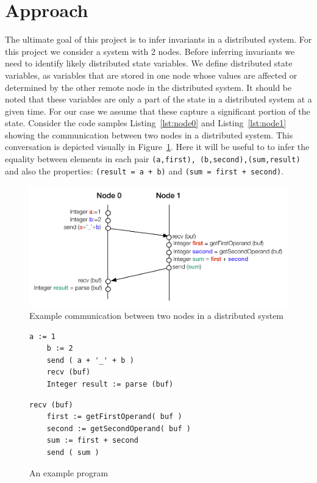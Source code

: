 \section{Approach}

The ultimate goal of this project is to infer invariants in a
distributed system. For this project we consider a
system with 2 nodes. Before inferring invariants we need to identify
likely distributed state variables. We define distributed state
variables, as variables that are stored in one node whose values are
affected or determined by the other remote node in the distributed
system. It should be noted that these variables are only a part of the
state in a distributed system at a given time. For our case we assume
that these capture a significant portion of the state. Consider the
code samples Listing~\ref{lst:node0} and Listing~\ref{lst:node1}
showing the communication between two nodes in a distributed system.
This conversation is depicted visually in
Figure~\ref{fig:sample_code_diag}. Here it will be useful to to infer
the equality between elements in each pair \texttt{(a,first),
(b,second),(sum,result)} and also the properties: \texttt{(result = a
+ b)} and \texttt{(sum = first + second)}.


\begin{figure}
  \includegraphics[width=\columnwidth]{sample_code.pdf}
  \caption{Example communication between two nodes in a distributed system}
  \label{fig:sample_code_diag}
\end{figure}

\begin{figure}
\begin{minipage}{.45\textwidth}
\begin{lstlisting}[caption={Sample code for Communication between 2 nodes - Node 0}, label=lst:node0]
    a := 1
    b := 2
    send ( a + '_' + b )
    recv (buf)
    Integer result := parse (buf)
\end{lstlisting}
\end{minipage}\hfill
\begin{minipage}{.45\textwidth}
\begin{lstlisting}[caption={Sample code for Communication between 2 nodes - Node 1}, label=lst:node1]
    recv (buf)
    first := getFirstOperand( buf )
    second := getSecondOperand( buf )
    sum := first + second
    send ( sum )
\end{lstlisting}
\end{minipage}\hfill
\caption{An example program}
\label{fig:exampleprog}
\end{figure}

